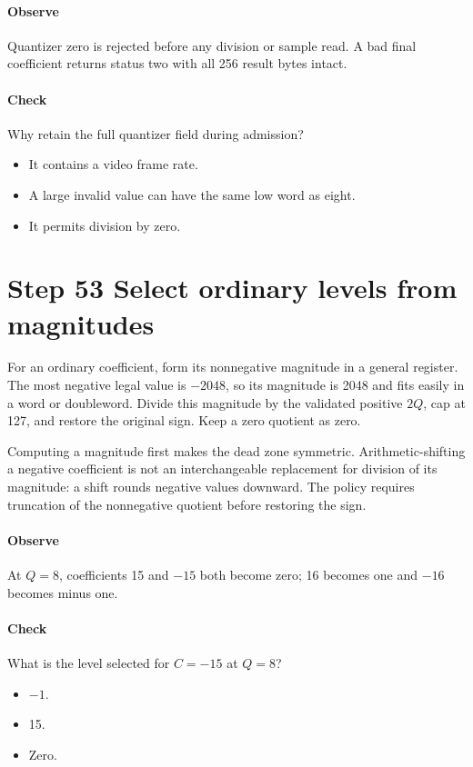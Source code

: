 \paragraph{Observe} Quantizer zero is rejected before any division or sample
read. A bad final coefficient returns status two with all 256 result bytes intact.
\paragraph{Check} Why retain the full quantizer field during admission?
\begin{itemize}
  \item[A.] It contains a video frame rate.
  \item[B.] A large invalid value can have the same low word as eight.
  \item[C.] It permits division by zero.
\end{itemize}

\section{Step 53 Select ordinary levels from magnitudes}\label{h263-quant-s03}
For an ordinary coefficient, form its nonnegative magnitude in a general register.
The most negative legal value is $-2048$, so its magnitude is 2048 and fits easily
in a word or doubleword. Divide this magnitude by the validated positive $2Q$,
cap at 127, and restore the original sign. Keep a zero quotient as zero.

Computing a magnitude first makes the dead zone symmetric. Arithmetic-shifting a
negative coefficient is not an interchangeable replacement for division of its
magnitude: a shift rounds negative values downward. The policy requires truncation
of the nonnegative quotient before restoring the sign.

\paragraph{Observe} At $Q=8$, coefficients 15 and $-15$ both become zero;
16 becomes one and $-16$ becomes minus one.
\paragraph{Check} What is the level selected for $C=-15$ at $Q=8$?
\begin{itemize}
  \item[A.] $-1$.
  \item[B.] 15.
  \item[C.] Zero.
\end{itemize}

